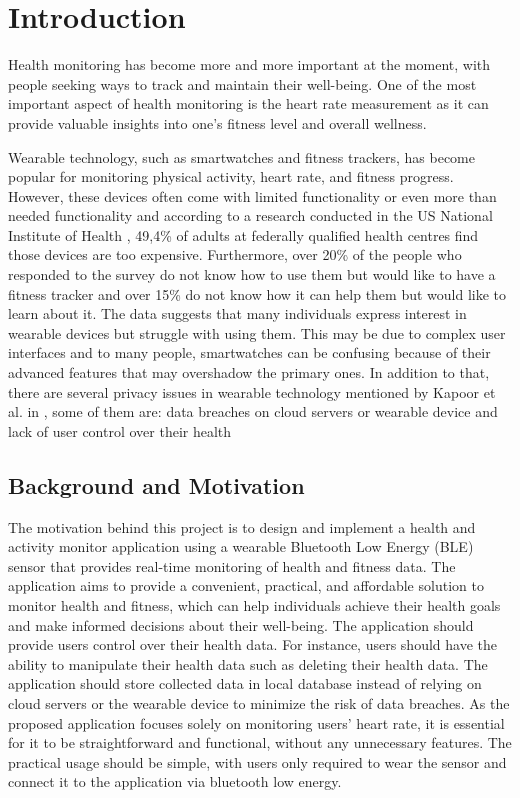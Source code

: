 \chapter{Introduction}

Health monitoring has become more and more important at the moment, with people seeking ways to track and maintain their well-being. 
One of the most important aspect of health monitoring is the heart rate measurement as it can provide valuable insights into one's fitness level and overall wellness.

Wearable technology, such as smartwatches and fitness trackers, has become popular for monitoring physical activity, heart rate, and fitness progress.
However, these devices often come with limited functionality or even more than needed functionality and according to a research conducted in the US National Institute of Health \autocite{holko2022wearable}, 49,4\% of adults at federally qualified health centres find those devices are too expensive. 
Furthermore, over 20\% of the people who responded to the survey do not know how to use them but would like to have a fitness tracker and over 15\% do not know how it can help them but would like to learn about it. 
The data suggests that many individuals express interest in wearable devices but struggle with using them. 
This may be due to complex user interfaces and to many people, smartwatches can be confusing because of their advanced features that may overshadow the primary ones. 
In addition to that, there are several privacy issues in wearable technology mentioned by Kapoor et al. in \autocite{kapoor2020privacy}, some of them are: data breaches on cloud servers or wearable device and lack of user control over their health

\section{Background and Motivation}
The motivation behind this project is to design and implement a health and activity monitor application using a wearable Bluetooth Low Energy (BLE) sensor that provides real-time monitoring of health and fitness data. 
The application aims to provide a convenient, practical, and affordable solution to monitor health and fitness, which can help individuals achieve their health goals and make informed decisions about their well-being.
The application should provide users control over their health data. For instance, users should have the ability to manipulate their health data such as deleting their health data. The application should store collected data in local database instead of relying on cloud servers or the wearable device to minimize the risk of data breaches.
As the proposed application focuses solely on monitoring users' heart rate, it is essential for it to be straightforward and functional, without any unnecessary features. 
The practical usage should be simple, with users only required to wear the sensor and connect it to the application via bluetooth low energy.


